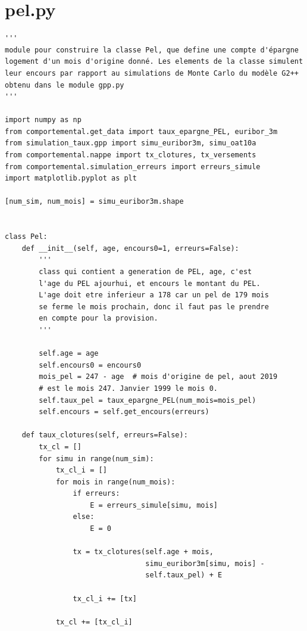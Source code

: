 \documentclass[12pt, a4paper]{book}
\begin{document}
{\begin{small}
\begin{verbatim}
\end{verbatim}
\end{small}




\section{pel.py}
\begin{small}
\begin{verbatim}
'''
module pour construire la classe Pel, que define une compte d'épargne
logement d'un mois d'origine donné. Les elements de la classe simulent
leur encours par rapport au simulations de Monte Carlo du modèle G2++
obtenu dans le module gpp.py
'''

import numpy as np
from comportemental.get_data import taux_epargne_PEL, euribor_3m
from simulation_taux.gpp import simu_euribor3m, simu_oat10a
from comportemental.nappe import tx_clotures, tx_versements
from comportemental.simulation_erreurs import erreurs_simule
import matplotlib.pyplot as plt

[num_sim, num_mois] = simu_euribor3m.shape


class Pel:
    def __init__(self, age, encours0=1, erreurs=False):
        '''
        class qui contient a generation de PEL, age, c'est
        l'age du PEL ajourhui, et encours le montant du PEL.
        L'age doit etre inferieur a 178 car un pel de 179 mois
        se ferme le mois prochain, donc il faut pas le prendre
        en compte pour la provision.
        '''

        self.age = age
        self.encours0 = encours0
        mois_pel = 247 - age  # mois d'origine de pel, aout 2019
        # est le mois 247. Janvier 1999 le mois 0.
        self.taux_pel = taux_epargne_PEL(num_mois=mois_pel)
        self.encours = self.get_encours(erreurs)

    def taux_clotures(self, erreurs=False):
        tx_cl = []
        for simu in range(num_sim):
            tx_cl_i = []
            for mois in range(num_mois):
                if erreurs:
                    E = erreurs_simule[simu, mois]
                else:
                    E = 0

                tx = tx_clotures(self.age + mois,
                                 simu_euribor3m[simu, mois] -
                                 self.taux_pel) + E

                tx_cl_i += [tx]

            tx_cl += [tx_cl_i]


\end{verbatim}
\end{small}}
\end{document}
